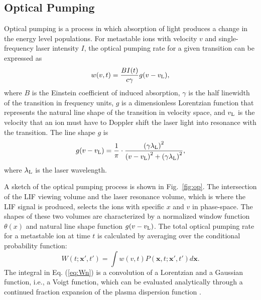 \documentclass[aip,pop,reprint]{revtex4-1}
\begin{document}
\subsection{Optical Pumping}
\label{subsec:opt}

Optical pumping is a process in which absorption of light produces a change in the energy level populations. For metastable ions with velocity $v$ and single-frequency laser intensity $I$, the optical pumping rate for a given transition can be expressed as
\begin{equation}
\label{eq:w}
w(v,t)=\frac{BI(t)}{c\gamma }g(v-v_\textup{L}),
\end{equation}
where $B$ is the Einstein coefficient of induced absorption, $\gamma$ is the half linewidth of the transition in frequency units, $g$ is a dimensionless Lorentzian function that represents the natural line shape of the transition in velocity space, and $v_\textup{L}$ is the velocity that an ion must have to Doppler shift the laser light into resonance with the transition. The line shape $g$ is
\begin{equation}
\label{eq:g}
g(v-v_\textup{L})=\frac{1}{\pi}\cdot \frac{\left ( \gamma \lambda _\textup{L} \right )^{2}}{\left ( v-v_\textup{L} \right )^2+\left ( \gamma \lambda _\textup{L} \right )^2} ,
\end{equation}
where $\lambda_\textup{L}$ is the laser wavelength. 

A sketch of the optical pumping process is shown in Fig.~\ref{fig:op}. The intersection of the LIF viewing volume and the laser resonance volume, which is where the LIF signal is produced, selects the ions with specific $x$ and $v$ in phase-space. The shapes of these two volumes are characterized by a normalized window function $\theta(x)$ and natural line shape function $g(v-v_\textup{L})$. The total optical pumping rate for a metastable ion at time $t$ is calculated by averaging over the conditional probability function:
\begin{equation}
\label{eq:Wn}
W(t;\mathbf{x'},t' )=\int w\left (v,t \right )P\left ( \mathbf{x},t;\mathbf{x'},t' \right )d\mathbf{x}.
\end{equation}
The integral in Eq. (\ref{eq:Wn}) is a convolution of a Lorentzian and a Gaussian function, i.e., a Voigt function, which can be evaluated analytically through a continued fraction expansion of the plasma dispersion function \cite{armstrong_spectrum_1967,mccabe_continued_1984}.
\end{document}
